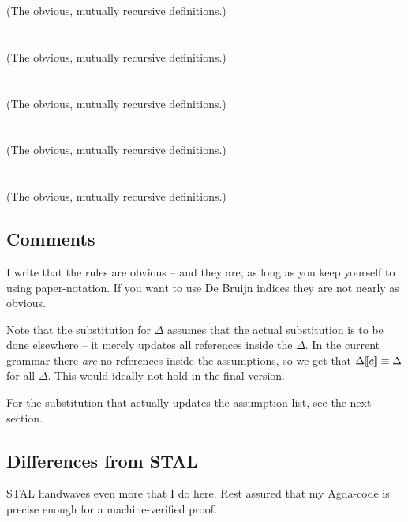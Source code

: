 (The obvious, mutually recursive definitions.)\\\\
\\

(The obvious, mutually recursive definitions.)\\\\
\\

(The obvious, mutually recursive definitions.)\\\\
\\

(The obvious, mutually recursive definitions.)\\\\
\\

(The obvious, mutually recursive definitions.)

\subsection{Comments}

I write that the rules are obvious -- and they are, as long as you keep yourself
to using paper-notation. If you want to use De Bruijn indices they are not
nearly as obvious.

Note that the substitution for $\Delta$ assumes that the actual substitution is
to be done elsewhere -- it merely updates all references inside the $\Delta$. In
the current grammar there \emph{are} no references inside the assumptions, so we
get that ${\Delta} \llbracket {c} \rrbracket \equiv {\Delta}$ for all $\Delta$. This would ideally
not hold in the final version.

For the substitution that actually updates the assumption list, see the next
section.

\subsection{Differences from STAL}

STAL handwaves even more that I do here. Rest assured that my Agda-code is
precise enough for a machine-verified proof.
